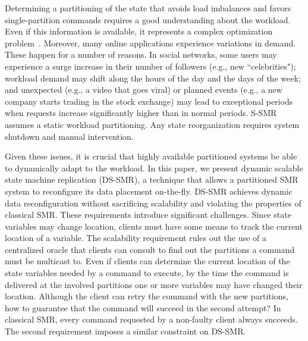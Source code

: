 Determining a partitioning of the state that avoids load imbalances and favors single-partition commands requires a good understanding about the workload. 
Even if this information is available, it represents a complex optimization problem~\cite{curino2010sch,Taft:2014}.
Moreover, many online applications experience variations in demand. 
These happen for a number of reasons. 
In social networks, some users may experience a surge increase in their number of followers (e.g., new ``celebrities");
workload demand may shift along the hours of the day and the days of the week; and unexpected (e.g., a video that goes viral) or planned events (e.g., a new company starts trading in the stock exchange) may lead to exceptional periods when requests increase significantly higher than in normal periods.
S-SMR assumes a static workload partitioning.
Any state reorganization requires system shutdown and manual intervention.

Given these issues, it is crucial that highly available partitioned systems be able to dynamically adapt to the workload.
In this paper, we present dynamic scalable state machine replication (DS-SMR), a technique that allows a partitioned SMR system to reconfigure its data placement on-the-fly.
DS-SMR achieves dynamic data reconfiguration without sacrificing scalability and violating the properties of classical SMR.
These requirements introduce significant challenges.
Since state variables may change location, clients must have some means to track the current location of a variable.
The scalability requirement rules out the use of a centralized oracle that clients can consult to find out the partitions a command must be multicast to.
Even if clients can determine the current location of the state variables needed by a command to execute, by the time the command is delivered at the involved partitions one or more variables may have changed their location.
Although the client can retry the command with the new partitions, how to guarantee that the command will succeed in the second attempt?
In classical SMR, every command requested by a non-faulty client always succeeds.
The second requirement imposes a similar constraint on DS-SMR.










